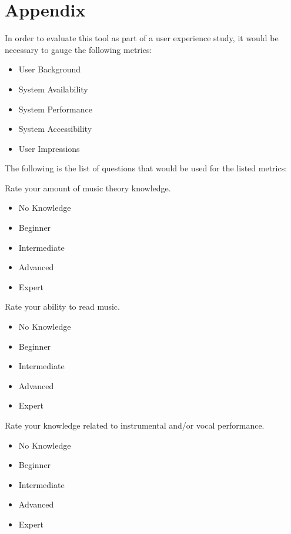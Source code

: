 \chapter*{Appendix}
\label{ch:appendix}

\noindent In order to evaluate this tool as part of a user experience study, it would be necessary to gauge the following metrics:

\begin{itemize}
	\item User Background
	\item System Availability
	\item System Performance
	\item System Accessibility
	\item User Impressions
\end{itemize}

The following is the list of questions that would be used for the listed metrics:

\noindent Rate your amount of music theory knowledge.

\begin{itemize}
	\item No Knowledge
	\item Beginner
	\item Intermediate
	\item Advanced
	\item Expert
\end{itemize}

\noindent Rate your ability to read music.

\begin{itemize}
	\item No Knowledge
	\item Beginner
	\item Intermediate
	\item Advanced
	\item Expert
\end{itemize}

\noindent Rate your knowledge related to instrumental and/or vocal performance.

\begin{itemize}
	\item No Knowledge
	\item Beginner
	\item Intermediate
	\item Advanced
	\item Expert
\end{itemize}

